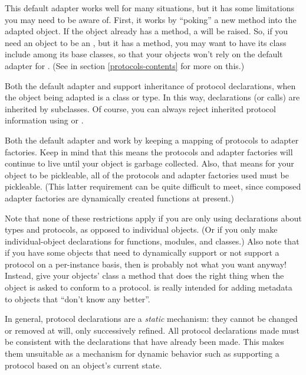 \begin{verbatim%
}
\begin{verbatim%
}
\begin{verbatim%
}
\begin{verbatim%
}
\begin{verbatim%
}
\begin{verbatim%
}
This default adapter works well for many situations, but it has some
limitations you may need to be aware of.  First, it works by ``poking'' a new
 method into the adapted object.  If the object already
has a  method, a  will be raised.  So,
if you need an object to be an , but it has a
 method, you may want to have its class include
 among its base classes, so that your objects won't rely
on the default adapter for .  (See 
in section \ref{protocols-contents} for more on this.)

Both the default adapter and  support inheritance of
protocol declarations, when the object being adapted is a class or type.  In
this way,  declarations (or
 calls) are inherited by
subclasses.  Of course, you can always reject inherited protocol information
using  or
.

Both the default adapter and  work by keeping a mapping of
protocols to adapter factories.  Keep in mind that this means the protocols and
adapter factories will continue to live until your object is garbage collected.
Also, that means for your object to be pickleable, all of the protocols and
adapter factories used must be pickleable.  (This latter requirement can be
quite difficult to meet, since composed adapter factories are dynamically
created functions at present.)

Note that none of these restrictions apply if you are only using declarations
about types and protocols, as opposed to individual objects.  (Or if you only
make individual-object declarations for functions, modules, and classes.)
Also note that if you have some objects that need to dynamically support or
not support a protocol on a per-instance basis, then 
is probably not what you want anyway!  Instead, give your objects' class a
 method that does the right thing when the object is
asked to conform to a protocol.   is really intended
for adding metadata to objects that ``don't know any better''.

In general, protocol declarations are a \emph{static} mechanism: they cannot be
changed or removed at will, only successively refined.  All protocol
declarations made must be consistent with the declarations that have already
been made.  This makes them unsuitable as a mechanism for dynamic behavior such
as supporting a protocol based on an object's current state.


\end{verbatim%
}
\end{verbatim%
}
\end{verbatim%
}
\end{verbatim%
}
\end{verbatim%
}
\end{verbatim%
}
